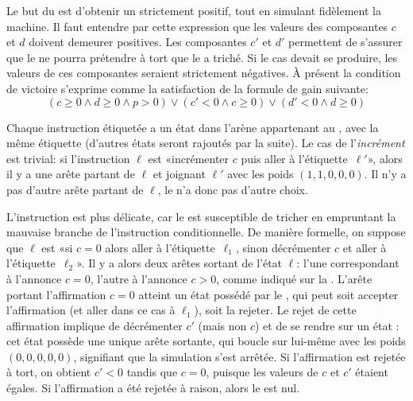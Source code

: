 Le but du \jo est d'obtenir un  strictement positif, tout en simulant fidèlement la machine.
Il faut entendre par cette expression que les valeurs des composantes $c$ et $d$ doivent demeurer positives.
Les composantes $c'$ et $d'$ permettent de s'assurer que le \ji ne pourra prétendre à tort que le \jo a triché.
Si le cas devait se produire, les valeurs de ces composantes seraient strictement négatives.
À présent la condition de victoire s'exprime comme la satisfaction de la formule de gain suivante:
\[(c\geq0 \wedge d\geq0 \wedge p>0) \vee (c'<0 \wedge c\geq0) \vee (d'<0 \wedge d\geq0)\]

Chaque instruction étiquetée a un état dans l'arène appartenant au \jo, avec la même étiquette (d'autres états seront rajoutés par la suite).
Le cas de l'\textit{incrément} est trivial: si l'instruction $\ell$ est «incrémenter $c$ puis aller à l'étiquette~$\ell'$», alors il y a une arête partant de $\ell$ et joignant $\ell'$ avec les poids $(1,1,0,0,0)$.
Il n'y a pas d'autre arête partant de $\ell$, le  n'a donc pas d'autre choix.

L'instruction \tjztest est plus délicate, car le \jo est susceptible de tricher en empruntant la mauvaise branche de l'instruction conditionnelle.
De manière formelle, on suppose que $\ell$ est «si $c=0$ alors aller à l'étiquette~$\ell_1$, sinon décrémenter $c$ et aller à l'étiquette~$\ell_2$».
Il y a alors deux arêtes sortant de l'état $\ell$: l'une correspondant à l'annonce $c=0$, l'autre à l'annonce $c>0$, comme indiqué sur la .
L'arête portant l'affirmation $c=0$ atteint un état possédé par le \ji, qui peut soit accepter l'affirmation (et aller dans ce cas à $\ell_1$), soit la rejeter.
Le rejet de cette affirmation implique de décrémenter $c'$ (mais non $c$) et de se rendre sur un état \tjstop: cet état possède une unique arête sortante, qui boucle sur lui-même avec les poids $(0,0,0,0,0)$, signifiant que la simulation s'est arrêtée.
Si l'affirmation est rejetée à tort, on obtient $c'<0$ tandis que $c=0$, puisque les valeurs de $c$ et $c'$ étaient égales.
Si l'affirmation a été rejetée à raison, alors le  est nul.

